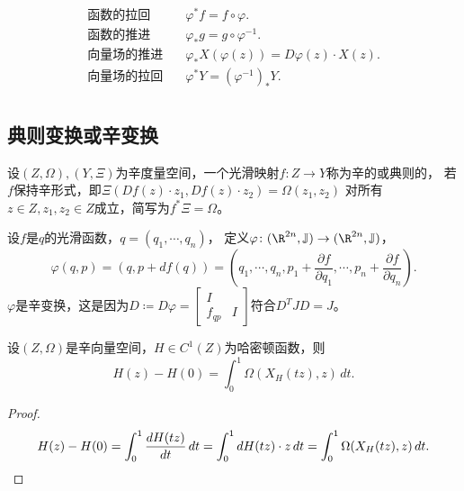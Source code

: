 \begin{definition}
    \begin{align*}
    函数的拉回\quad &\varphi^*f=f\circ\varphi.\\
    函数的推进\quad &\varphi_*g=g\circ\varphi^{-1}.\\
    向量场的推进\quad &\varphi_*X(\varphi(z))=D\varphi(z)\cdot X(z).\\
    向量场的拉回\quad &\varphi^*Y=(\varphi^{-1})_*Y.\\
    \end{align*}
\end{definition}

\subsection{典则变换或辛变换}
\begin{definition}
    设$(Z,\Omega),(Y,\Xi)$为辛度量空间，一个光滑映射$f\colon Z\to Y$称为辛的或典则的，
    若$f$保持辛形式，即$\Xi(Df(z)\cdot z_1,Df(z)\cdot z_2)=\Omega(z_1,z_2)$
    对所有$z\in Z,z_1,z_2\in Z$成立，简写为$f^*\Xi=\Omega$。
\end{definition}

\begin{example}
    设$f$是$q$的光滑函数，$q=(q_1,\cdots,q_n)$，
    定义$\varphi\colon(\R^{2n},\j)\to(\R^{2n},\j)$，
    $$\varphi(q,p)=(q,p+df(q))=(q_1,\cdots,q_n,
    p_1+\frac{\partial f}{\partial q_1},\cdots,
    p_n+\frac{\partial f}{\partial q_n}).$$
    $\varphi$是辛变换，这是因为$D\coloneqq D\varphi
    =\begin{bmatrix}I& \\f_{qp}&I\end{bmatrix}$符合$D^TJD=J$。
\end{example}

\begin{proposition}
    设$(Z,\Omega)$是辛向量空间，$H\in C^1(Z)$为哈密顿函数，则
    $$H(z)-H(0)=\int_0^1\Omega(X_H(tz),z)\,dt.$$
\end{proposition}
\begin{proof}
    $$H(z)-H(0)=\int_0^1\frac{dH(tz)}{dt}\,dt=\int_0^1dH(tz)\cdot z\,dt
    =\int_0^1\Omega(X_H(tz),z)\,dt.\qedhere$$
\end{proof}


